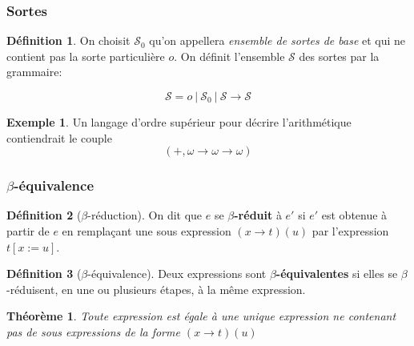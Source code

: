 \documentclass[11pt,a4paper]{beamer}
\theoremstyle{plain}
\newtheorem{thm}{Théorème}[section]
\theoremstyle{definition}
\newtheorem{defn}{Définition}[section]
\newtheorem{exmp}{Exemple}[section]
\theoremstyle{remark}
\begin{document}
\begin{frame}
\frametitle{Sortes}
\begin{defn}
On choisit $\mathcal{S}_0$ qu'on appellera \textit{ensemble de sortes de base} et qui ne contient pas la sorte particulière $o$. On définit l'ensemble $\mathcal{S}$ des sortes par la grammaire:

\[ \mathcal{S} = o~|~\mathcal{S}_0~|~\mathcal{S}\rightarrow\mathcal{S} \]
\end{defn}

\begin{exmp}
Un langage d'ordre supérieur pour décrire l'arithmétique contiendrait le couple
\[ \left(+, \omega \rightarrow \omega \rightarrow \omega\right) \]
\end{exmp}
\end{frame}

\begin{frame}
\frametitle{$\beta$-équivalence}
\begin{defn}[$\beta$-réduction]
On dit que $e$ se \textbf{$\beta$-réduit} à $e'$ si $e'$ est obtenue à partir de $e$ en remplaçant une sous expression $(x\rightarrow t)(u)$ par l'expression $t[x:=u]$.
\end{defn}

\begin{defn}[$\beta$-équivalence]
Deux expressions sont \textbf{$\beta$-équivalentes} si elles se $\beta$-réduisent, en une ou plusieurs étapes, à la même expression.
\end{defn}

\begin{thm}
Toute expression est égale à une unique expression ne contenant pas de sous expressions de la forme $(x\rightarrow t)(u)$
\end{thm}
\end{frame}
\end{document}
